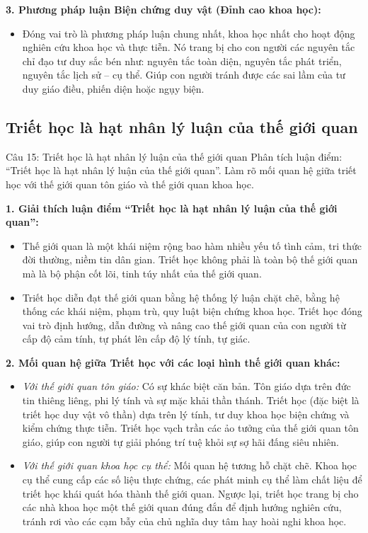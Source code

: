 \documentclass[12pt,a4paper]{article}
\begin{document}
{\noindent
\textbf{3. Phương pháp luận Biện chứng duy vật (Đỉnh cao khoa học):}
\begin{itemize}
    \item Đóng vai trò là phương pháp luận chung nhất, khoa học nhất cho hoạt động nghiên cứu khoa học và thực tiễn. Nó trang bị cho con người các nguyên tắc chỉ đạo tư duy sắc bén như: nguyên tắc toàn diện, nguyên tắc phát triển, nguyên tắc lịch sử -- cụ thể. Giúp con người tránh được các sai lầm của tư duy giáo điều, phiến diện hoặc ngụy biện.
\end{itemize}

\subsection{Triết học là hạt nhân lý luận của thế giới quan}

\begin{questionbox}{Câu 15: Triết học là hạt nhân lý luận của thế giới quan}
Phân tích luận điểm: ``Triết học là hạt nhân lý luận của thế giới quan''. Làm rõ mối quan hệ giữa triết học với thế giới quan tôn giáo và thế giới quan khoa học.
\end{questionbox}

\noindent
\textbf{1. Giải thích luận điểm ``Triết học là hạt nhân lý luận của thế giới quan'':}
\begin{itemize}
    \item Thế giới quan là một khái niệm rộng bao hàm nhiều yếu tố tình cảm, tri thức đời thường, niềm tin dân gian. Triết học không phải là toàn bộ thế giới quan mà là bộ phận cốt lõi, tinh túy nhất của thế giới quan.
    \item Triết học diễn đạt thế giới quan bằng hệ thống lý luận chặt chẽ, bằng hệ thống các khái niệm, phạm trù, quy luật biện chứng khoa học. Triết học đóng vai trò định hướng, dẫn đường và nâng cao thế giới quan của con người từ cấp độ cảm tính, tự phát lên cấp độ lý tính, tự giác.
\end{itemize}

\noindent
\textbf{2. Mối quan hệ giữa Triết học với các loại hình thế giới quan khác:}
\begin{itemize}
    \item \textit{Với thế giới quan tôn giáo:} Có sự khác biệt căn bản. Tôn giáo dựa trên đức tin thiêng liêng, phi lý tính và sự mặc khải thần thánh. Triết học (đặc biệt là triết học duy vật vô thần) dựa trên lý tính, tư duy khoa học biện chứng và kiểm chứng thực tiễn. Triết học vạch trần các ảo tưởng của thế giới quan tôn giáo, giúp con người tự giải phóng trí tuệ khỏi sự sợ hãi đấng siêu nhiên.
    \item \textit{Với thế giới quan khoa học cụ thể:} Mối quan hệ tương hỗ chặt chẽ. Khoa học cụ thể cung cấp các số liệu thực chứng, các phát minh cụ thể làm chất liệu để triết học khái quát hóa thành thế giới quan. Ngược lại, triết học trang bị cho các nhà khoa học một thế giới quan đúng đắn để định hướng nghiên cứu, tránh rơi vào các cạm bẫy của chủ nghĩa duy tâm hay hoài nghi khoa học.
\end{itemize}

}
\end{document}
